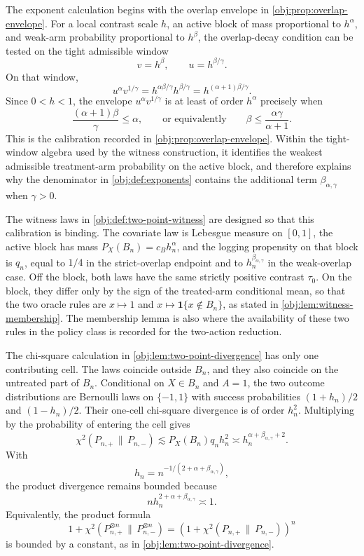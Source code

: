 \documentclass[11pt]{article}
\begin{document}
The exponent calculation begins with the overlap envelope in \cref{obj:prop:overlap-envelope}.  For a local contrast scale \(h\), an active block of mass proportional to \(h^\alpha\), and weak-arm probability proportional to \(h^\beta\), the overlap-decay condition can be tested on the tight admissible window
\[
v=h^\beta,
\qquad
u=h^{\beta/\gamma}.
\]
On that window,
\[
u^\alpha v^{1/\gamma}
=
h^{\alpha\beta/\gamma}h^{\beta/\gamma}
=
h^{(\alpha+1)\beta/\gamma}.
\]
Since \(0<h<1\), the envelope \(u^\alpha v^{1/\gamma}\) is at least of order \(h^\alpha\) precisely when
\[
\frac{(\alpha+1)\beta}{\gamma}\le \alpha,
\qquad\text{or equivalently}\qquad
\beta\le \frac{\alpha\gamma}{\alpha+1}.
\]
This is the calibration recorded in \cref{obj:prop:overlap-envelope}.  Within the tight-window algebra used by the witness construction, it identifies the weakest admissible treatment-arm probability on the active block, and therefore explains why the denominator in \cref{obj:def:exponents} contains the additional term \(\beta_{\alpha,\gamma}\) when \(\gamma>0\).

The witness laws in \cref{obj:def:two-point-witness} are designed so that this calibration is binding.  The covariate law is Lebesgue measure on \([0,1]\), the active block has mass \(P_X(B_n)=c_Bh_n^\alpha\), and the logging propensity on that block is \(q_n\), equal to \(1/4\) in the strict-overlap endpoint and to \(h_n^{\beta_{\alpha,\gamma}}\) in the weak-overlap case.  Off the block, both laws have the same strictly positive contrast \(\tau_0\).  On the block, they differ only by the sign of the treated-arm conditional mean, so that the two oracle rules are \(x\mapsto 1\) and \(x\mapsto \mathbf 1\{x\notin B_n\}\), as stated in \cref{obj:lem:witness-membership}.  The membership lemma is also where the availability of these two rules in the policy class is recorded for the two-action reduction.

The chi-square calculation in \cref{obj:lem:two-point-divergence} has only one contributing cell.  The laws coincide outside \(B_n\), and they also coincide on the untreated part of \(B_n\).  Conditional on \(X\in B_n\) and \(A=1\), the two outcome distributions are Bernoulli laws on \(\{-1,1\}\) with success probabilities \((1+h_n)/2\) and \((1-h_n)/2\).  Their one-cell chi-square divergence is of order \(h_n^2\).  Multiplying by the probability of entering the cell gives
\[
\chi^2(P_{n,+}\,\|\,P_{n,-})
\lesssim
P_X(B_n)q_nh_n^2
\asymp
h_n^{\alpha+\beta_{\alpha,\gamma}+2}.
\]
With
\[
h_n=n^{-1/(2+\alpha+\beta_{\alpha,\gamma})},
\]
the product divergence remains bounded because
\[
n h_n^{2+\alpha+\beta_{\alpha,\gamma}}\asymp 1.
\]
Equivalently, the product formula
\[
1+\chi^2(P_{n,+}^{\otimes n}\,\|\,P_{n,-}^{\otimes n})
=
\left(1+\chi^2(P_{n,+}\,\|\,P_{n,-})\right)^n
\]
is bounded by a constant, as in \cref{obj:lem:two-point-divergence}.
\end{document}
